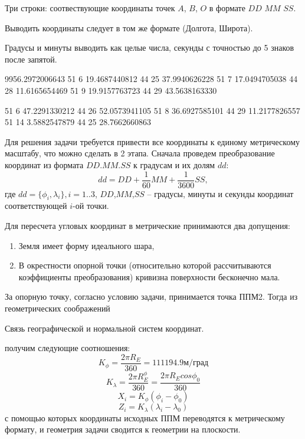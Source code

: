 \outputfmtSection

Три строки: соотвествующие координаты точек $A$, $B$, $O$  в формате $DD$ $MM$ $SS$.

Выводить координаты следует в том же формате (Долгота, Широта).

Градусы и минуты выводить как целые числа, секунды с точностью до 5 знаков после запятой.


\begin{myverbbox}[\small]{\vinput}
    9956.2972006643
    51 6 19.4687440812 44 25 37.9940626228
    51 7 17.0494705038 44 28 11.6165654469
    51 9 19.9157763723 44 29 43.5638163330
\end{myverbbox}
\begin{myverbbox}[\small]{\voutput}
    51 6 47.2291330212 44 26 52.0573941105
    51 8 36.6927585101 44 29 11.2177826557
    51 14 3.5882547879 44 25 28.7662660863
\end{myverbbox}

\solutionSection

Для решения задачи требуется привести все координаты к единому метрическому масштабу, что можно сделать в 2 
этапа. Сначала проведем преобразование координат из формата $DD.MM.SS$ к градусам и их долям $dd$:
$$dd=DD+\frac{1}{60} MM+\frac{1}{3600} SS,$$
где $dd=\{\phi_i,\lambda_i\},i=1..3$, $DD$,$MM$,$SS$ – градусы, минуты и секунды координат соответствующей $i$-ой точки. 

Для пересчета угловых координат в метрические принимаются два допущения:
\begin{enumerate}
    \item Земля имеет форму идеального шара,
    \item В окрестности опорной точки (относительно которой рассчитываются коэффициенты преобразования) 
    кривизна поверхности бесконечно мала.
\end{enumerate}

За опорную точку, согласно условию задачи, принимается точка ППМ2. Тогда из геометрических соображений

\begin{center}
    Связь географической и нормальной систем координат.
\end{center}

\noindent получим следующие соотношения:
$$K_\phi=\frac{2\pi R_E}{360}=111194.9 \text{м/град}$$
$$K_\lambda=\frac{2\pi R_E^\phi}{360}=\frac{2\pi R_E  cos\phi_0}{360}$$
$$X_i=K_\phi (\phi_i-\phi_0)$$
$$Z_i=K_\lambda (\lambda_i-\lambda_0)$$
с помощью которых координаты исходных ППМ переводятся к метрическому формату, и геометрия задачи сводится к 
геометрии на плоскости. 

